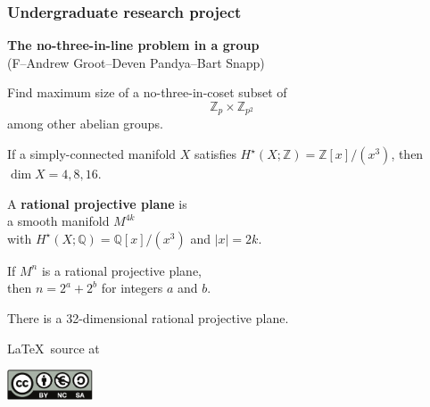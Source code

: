 \documentclass[14pt]{chalkfjord}
\newcommand{\clearbackgroundpicture}{\usebackgroundtemplate{}}
\newcommand{\Z}{\mathbb{Z}}
\newcommand{\Q}{\mathbb{Q}}
\begin{document}
\begin{frame}[label=no-three-in-line]
  \frametitle{Undergraduate research project}
  
  \vfill
  
  \textbf{The no-three-in-line problem in a group} \\
  (F--Andrew Groot--Deven Pandya--Bart Snapp)

  \vfill\pause

  Find maximum size of a no-three-in-coset subset of
  $$\mathbb{Z}_p \times \mathbb{Z}_{p^2}$$
  among other abelian groups.

  \vfill
  
\end{frame}

\begin{frame}[nofills,label=rational-projective-planes]

  \begin{theorem}[Adams]
    If a simply-connected manifold $X$ satisfies $H^\star(X; \Z) =
    \Z[x]/(x^3)$, then $\dim X = 4, 8, 16$.    
  \end{theorem}

  \pause%
  \vfill

  A \textbf{rational projective plane} is  \\
  \quad a smooth manifold $M^{4k}$ \\
  \quad with $H^\star(X;\Q) = \Q[x]/(x^3)$ and $|x| = 2k$. \\

  \pause%
  \vfill

  \begin{theorem}[F--Zhixu Su]
    If $M^n$ is a rational projective plane, \\
    \quad then $n = 2^a + 2^b$ for integers $a$ and $b$.
  \end{theorem}  
  
  \pause%
  \vfill

  There is a 32-dimensional rational projective plane.
  
  \pause %
  
\end{frame}


 \clearbackgroundpicture
 \begin{frame}[nofills,label=thanks]
   \vfill
   \begin{center}
   \Huge
   \end{center}
   \vfill

   \LaTeX\ source at \\

   \vfill
   \includegraphics[width=1in]{cc-logo.pdf}
   \hfill\footnotesize{}
   \null
 \end{frame}
\end{document}
